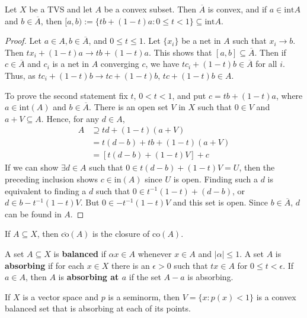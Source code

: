 \begin{prop}
    Let $X$ be a TVS and let $A$ be a convex subset. Then $\overline{A}$ is convex, and if $a \in \text{int}A$ and $b \in \overline{A}$, then $[a,b) := \{tb+(1-t)a:0\leq t< 1\}\subseteq \text{int}A$.
\end{prop}
\begin{proof}
    Let $a \in A, b \in \overline{A}$, and $0 \leq t \leq 1$. Let $\{x_i\}$ be a net in $A$ such that $x_i\rightarrow b$. Then $tx_i+(1-t)a\rightarrow tb+(1-t)a$. This shows that $[a,b] \subseteq \overline{A}$. Then if $c \in \overline{A}$ and $c_i$ is a net in $A$ converging $c$, we have $tc_i+(1-t)b \in \overline{A}$ for all $i$. Thus, as $tc_i+(1-t)b\rightarrow tc+(1-t)b$, $tc+(1-t)b \in A$.

    To prove the second statement fix $t$, $0 < t < 1$, and put $c = tb+(1-t)a$, where $a \in \text{int}(A)$ and $b \in \overline{A}$. There is an open set $V$ in $X$ such that $0 \in V$ and $a+V \subseteq A$. Hence, for any $d \in A$, \begin{align*}
        A &\supseteq td+(1-t)(a+V) \\
        &= t(d-b)+tb+(1-t)(a+V) \\
        &=[t(d-b)+(1-t)V]+c
    \end{align*}
    If we can show $\exists d \in A$ such that $0\in t(d-b)+(1-t)V = U$, then the preceding inclusion shows $c \in \text{in}(A)$ since $U$ is open. Finding such a $d$ is equivalent to finding a $d$ such that $0 \in t^{-1}(1-t)+(d-b)$, or $d \in b-t^{-1}(1-t)V$. But $0 \in -t^{-1}(1-t)V$ and this set is open. Since $b \in \overline{A}$, $d$ can be found in $A$.
\end{proof}

\begin{cor}
    If $A \subseteq X$, then $\overline{\text{co}}(A)$ is the closure of $\text{co}(A)$.
\end{cor}

A set $A \subseteq X$ is \textbf{balanced} if $\alpha x \in A$ whenever $x \in A$ and $|\alpha| \leq 1$. A set $A$ is \textbf{absorbing} if for each $x \in X$ there is an $\epsilon > 0$ such that $tx \in A$ for $0 \leq t < \epsilon$. If $a \in A$, then $A$ is \textbf{absorbing at $a$} if the set $A-a$ is absorbing.

If $X$ is a vector space and $p$ is a seminorm, then $V = \{x:p(x) < 1\}$ is a convex balanced set that is absorbing at each of its points.


